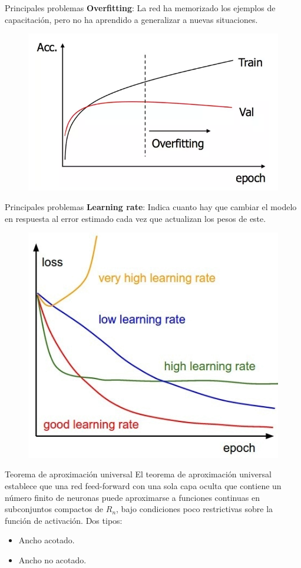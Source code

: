 \documentclass[spanish]{beamer}
\begin{document}
\begin{frame}{Principales problemas}
\textbf{Overfitting}: La red ha memorizado los ejemplos de capacitación, pero no ha aprendido a generalizar a nuevas situaciones.
  \begin{figure}[h]
    \centering
    \includegraphics[width=.6\textwidth]{img/overfitting}
  \end{figure}
\end{frame}
\begin{frame}{Principales problemas}
\textbf{Learning rate}: Indica cuanto hay que cambiar el modelo en respuesta al error estimado cada vez que actualizan los pesos de este.
  \begin{figure}[h]
    \centering
    \includegraphics[width=.6\textwidth]{img/learning-rate}
  \end{figure}
\end{frame}

\begin{frame}{Teorema de aproximación universal}
El teorema de aproximación universal establece que una red feed-forward con una sola capa oculta que contiene un número finito de neuronas puede aproximarse a funciones continuas en subconjuntos compactos de $R_n$, bajo condiciones poco restrictivas sobre la función de activación.
Dos tipos:
\begin{itemize}
  \item Ancho acotado.
  \item Ancho no acotado.
\end{itemize}
\end{frame}
\end{document}
